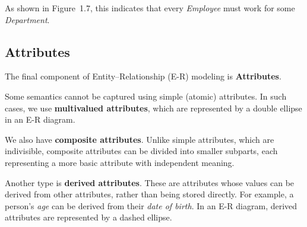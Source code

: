 As shown in Figure~1.7, this indicates that every \emph{Employee} must work for some \emph{Department}.

\subsection{Attributes}
The final component of Entity–Relationship (E-R) modeling is \textbf{Attributes}.  

Some semantics cannot be captured using simple (atomic) attributes. In such cases, we use \textbf{multivalued attributes}, which are represented by a double ellipse in an E-R diagram.  

We also have \textbf{composite attributes}. Unlike simple attributes, which are indivisible, composite attributes can be divided into smaller subparts, each representing a more basic attribute with independent meaning.  

Another type is \textbf{derived attributes}. These are attributes whose values can be derived from other attributes, rather than being stored directly. For example, a person's \emph{age} can be derived from their \emph{date of birth}. In an E-R diagram, derived attributes are represented by a dashed ellipse.
